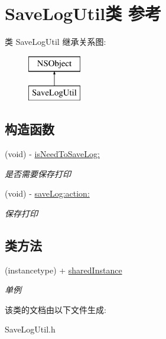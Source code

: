 \hypertarget{interface_save_log_util}{}\section{Save\+Log\+Util类 参考}
\label{interface_save_log_util}
类 Save\+Log\+Util 继承关系图\+:\begin{figure}[H]
\begin{center}
\leavevmode
\includegraphics[height=2.000000cm]{interface_save_log_util}
\end{center}
\end{figure}
\subsection*{构造函数}
\begin{DoxyCompactItemize}
\item 
\mbox{\label{interface_save_log_util_af6bb7507596eae70afdcaad3a1a0d31e}} 
(void) -\/ \hyperlink{interface_save_log_util_af6bb7507596eae70afdcaad3a1a0d31e}{is\+Need\+To\+Save\+Log\+:}
\begin{DoxyCompactList}\small\item\em 是否需要保存打印 \end{DoxyCompactList}\item 
\mbox{\label{interface_save_log_util_ad79d14e9298625ff5308d0122a302f13}} 
(void) -\/ \hyperlink{interface_save_log_util_ad79d14e9298625ff5308d0122a302f13}{save\+Log\+:action\+:}
\begin{DoxyCompactList}\small\item\em 保存打印 \end{DoxyCompactList}\end{DoxyCompactItemize}
\subsection*{类方法}
\begin{DoxyCompactItemize}
\item 
\mbox{\label{interface_save_log_util_a4c80ea141f0f85a0e3a457519d0c4a70}} 
(instancetype) + \hyperlink{interface_save_log_util_a4c80ea141f0f85a0e3a457519d0c4a70}{shared\+Instance}
\begin{DoxyCompactList}\small\item\em 单例 \end{DoxyCompactList}\end{DoxyCompactItemize}


该类的文档由以下文件生成\+:\begin{DoxyCompactItemize}
\item 
Save\+Log\+Util.\+h\end{DoxyCompactItemize}
